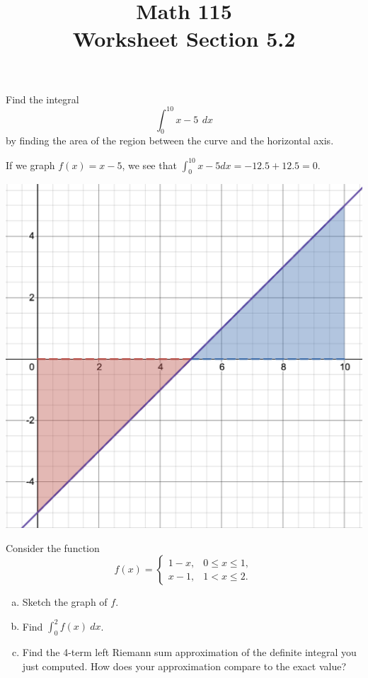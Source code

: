 \documentclass[11pt]{exam}
\title{\vspace{-0.5in} Math 115 \\ Worksheet Section 5.2}
\date{}
\begin{document}
\maketitle
\vspace{-0.75in}
\begin{questions}
  \question Find the integral \[\int_0^{10} x-5 \,\:dx\] by finding the area of the region between the curve and the horizontal axis.
    \begin{solution}
      If we graph \(f(x) = x-5\), we see that \(\int_0^{10} x-5 dx =
      -12.5+12.5 = 0\).

      \begin{center}
        \includegraphics[scale=0.4]{Figures/s1}
      \end{center}
    \end{solution}
  \question Consider the function
\[
f(x) = \begin{cases}
1-x,	& 0 \leqslant x \leqslant 1,\\
x-1,	& 1 < x \leqslant 2.
\end{cases}
\]
\vspace{-2.5em}
\begin{enumerate}[(a)]
	\item Sketch the graph of $f$.
	\item Find $\displaystyle\int_0^2 f(x)\: dx$.
	\item Find the 4-term left Riemann sum approximation of the definite integral you just computed. How does your approximation compare to the exact value?

\end{enumerate}
\end{questions}
\end{document}
